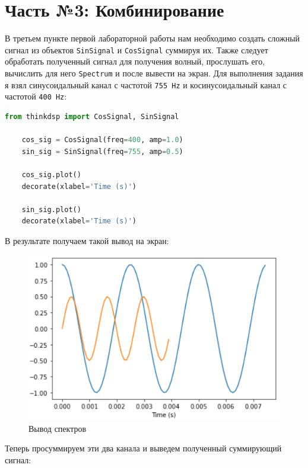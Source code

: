 \documentclass[a4paper]{article}
\begin{document}
    \newpage
        \section{Часть №3: Комбинирование}
            В третьем пункте первой лабораторной работы нам необходимо создать сложный сигнал из объектов \texttt{SinSignal} и \texttt{CosSignal} суммируя их. Также следует обработать полученный сигнал для получения волный, прослушать его, вычислить для него  \texttt{Spectrum} и после вывести на экран.
            Для выполнения задания я взял синусоидальный канал с частотой \texttt{755 Hz} и косинусоидальный канал с частотой \texttt{400 Hz}:
            
\begin{lstlisting}[language=Python, caption= Создание каналов]
    from thinkdsp import CosSignal, SinSignal

    cos_sig = CosSignal(freq=400, amp=1.0)
    sin_sig = SinSignal(freq=755, amp=0.5)

    cos_sig.plot()
    decorate(xlabel='Time (s)')

    sin_sig.plot()
    decorate(xlabel='Time (s)')
\end{lstlisting}
            
            В результате получаем такой вывод на экран:
            \begin{figure}[H]
                \centering
                \includegraphics[width=\textwidth]{spectr_out.png}
                \caption{Вывод спектров}
                \label{fig:spectr_out}
            \end{figure}
            
            Теперь просуммируем эти два канала и выведем полученный суммирующий сигнал:
            
\end{document}
